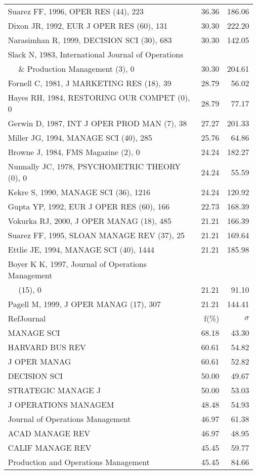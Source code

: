 \documentclass[a4paper,11pt]{report}
\begin{document}
\begin{landscape}
\begin{table}[!ht]
{\begin{tabular}{|l r r|}
Suarez FF, 1996, OPER RES (44), 223 & 36.36 & 186.06\\
Dixon JR, 1992, EUR J OPER RES (60), 131 & 30.30 & 222.20\\
Narasimhan R, 1999, DECISION SCI (30), 683 & 30.30 & 142.05\\
Slack N, 1983, International Journal of Operations &  & \\
$\quad$ \& Production Management (3), 0 & 30.30 & 204.61\\
Fornell C, 1981, J MARKETING RES (18), 39 & 28.79 & 56.02\\
Hayes RH, 1984, RESTORING OUR COMPET (0), 0 & 28.79 & 77.17\\
Gerwin D, 1987, INT J OPER PROD MAN (7), 38 & 27.27 & 201.33\\
Miller JG, 1994, MANAGE SCI (40), 285 & 25.76 & 64.86\\
Browne J, 1984, FMS Magazine (2), 0 & 24.24 & 182.27\\
Nunnally JC, 1978, PSYCHOMETRIC THEORY (0), 0 & 24.24 & 55.59\\
Kekre S, 1990, MANAGE SCI (36), 1216 & 24.24 & 120.92\\
Gupta YP, 1992, EUR J OPER RES (60), 166 & 22.73 & 168.39\\
Vokurka RJ, 2000, J OPER MANAG (18), 485 & 21.21 & 166.39\\
Suarez FF, 1995, SLOAN MANAGE REV (37), 25 & 21.21 & 169.64\\
Ettlie JE, 1994, MANAGE SCI (40), 1444 & 21.21 & 185.98\\
Boyer K K, 1997, Journal of Operations Management &  & \\
$\quad$ (15), 0 & 21.21 & 91.10\\
Pagell M, 1999, J OPER MANAG (17), 307 & 21.21 & 144.41\\
\hline
\hline
RefJournal & f(\%) & $\sigma$\\
\hline
MANAGE SCI & 68.18 & 43.30\\
HARVARD BUS REV & 60.61 & 54.82\\
J OPER MANAG & 60.61 & 52.82\\
DECISION SCI & 50.00 & 49.67\\
STRATEGIC MANAGE J & 50.00 & 53.03\\
J OPERATIONS MANAGEM & 48.48 & 54.93\\
Journal of Operations Management & 46.97 & 61.38\\
ACAD MANAGE REV & 46.97 & 48.95\\
CALIF MANAGE REV & 45.45 & 59.77\\
Production and Operations Management & 45.45 & 84.66\\
\hline
\end{tabular}
}
\end{table}


\end{landscape}
\end{document}
